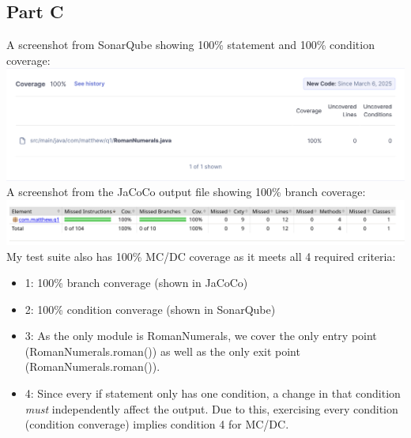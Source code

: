 \documentclass{article}
\begin{document}
\subsection{Part C}
A screenshot from SonarQube showing 100\% statement and 100\% condition coverage:\\
\includegraphics[scale=0.3]{sonarq.png}\\
A screenshot from the JaCoCo output file showing 100\% branch coverage:\\
\includegraphics[scale=0.3]{jacoco.png}\\
My test suite also has 100\% MC/DC coverage as it meets all 4 required criteria:
\begin{itemize}
	\item 1: 100\% branch converage (shown in JaCoCo)
	\item 2: 100\% condition converage (shown in SonarQube)
	\item 3: As the only module is RomanNumerals, we cover the only entry point (RomanNumerals.roman()) as well as the only exit point
		(RomanNumerals.roman()).
	\item 4: Since every if statement only has one condition, a change in that condition \textit{must} independently affect the output.
		Due to this, exercising every condition (condition converage) implies condition 4 for MC/DC.
\end{itemize}
\end{document}
